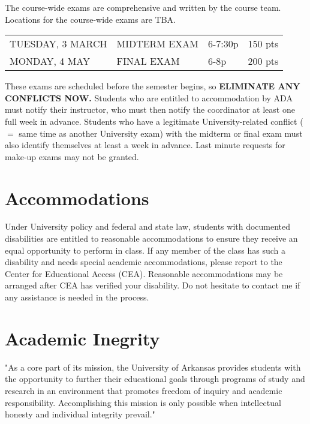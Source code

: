 \documentclass[margin,line,pifont,palatino,courier]{res}
\begin{document}
\begin{resume}
The course-wide exams are comprehensive and written by the course team.  Locations for the course-wide exams are TBA.  

{\bf
\begin{tabular}{llll}
TUESDAY, 3 MARCH & MIDTERM EXAM & 6-7:30p & 150 pts \\
MONDAY, 4 MAY & FINAL EXAM & 6-8p & 200 pts \\
\end{tabular} 
}

These exams are scheduled before the semester begins, so {\bf ELIMINATE ANY CONFLICTS NOW.} Students who are entitled to accommodation by ADA must notify their instructor, who must then notify the coordinator at least one full week in advance. Students who have a legitimate University-related conflict ($=$ same time as another University exam) with the midterm or final exam must also identify themselves at least a week in advance. Last minute requests for make-up exams may not be granted. 

\section{\sc Accommodations} Under University policy and federal and state law, students with documented disabilities are entitled to reasonable accommodations to ensure they receive an equal opportunity to perform in class.  If any member of the class has such a disability and needs special academic accommodations, please report to the Center for Educational Access (CEA).  Reasonable accommodations may be arranged after CEA has verified your disability.  Do not hesitate to contact me if any assistance is needed in the process.
 
\section{\sc Academic Inegrity} "As a core part of its mission, the University of Arkansas provides students with the opportunity to further their educational goals through programs of study and research in an environment that promotes freedom of inquiry and academic responsibility. Accomplishing this mission is only possible when intellectual honesty and individual integrity prevail." 


\end{resume}
\end{document}
